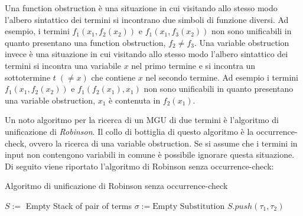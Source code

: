 \documentclass[./main.tex]{subfiles}
\begin{document}
Una function obstruction è una situazione in cui visitando allo stesso modo l'albero sintattico dei termini si incontrano
due simboli di funzione diversi. Ad esempio, i termini $f_1(x_1, f_2(x_2))$ e $f_1(x_1, f_3(x_2))$ non sono unificabili in quanto
presentano una function obstruction, $f_2 \neq f_3$. Una variable obstruction invece è una situazione in cui visitando allo stesso modo
l'albero sintattico dei termini si incontra una variabile $x$ nel primo termine 
e si incontra un sottotermine $t \; (\neq x)$ che contiene $x$ nel secondo termine. Ad esempio i termini $f_1(x_1, f_2(x_2))$ e $f_1(f_2(x_1), x_1)$
non sono unificabili in quanto presentano una variable obstruction, $x_1$ è contenuta in $f_2(x_1)$.


Un noto algoritmo per la ricerca di un MGU di due termini è l'algoritmo di unificazione di \textit{Robinson}. Il collo di bottiglia di questo 
algoritmo è la occurrence-check, ovvero la ricerca di una variable obstruction. Se si assume che i termini in 
input non contengono variabili in comune è possibile ignorare questa situazione. Di seguito viene riportato l'algoritmo di Robinson
senza occurrence-check:

\begin{algorithm}[H]
  \caption{Algoritmo di unificazione di Robinson senza occurrence-check}


  $S :=$ Empty Stack of pair of terms\;
  $\sigma := \text{Empty Substitution}$\;
  \BlankLine
  $S.push(\tau_1, \tau_2)$\;

  \Return{$\sigma$}\;
\end{algorithm}
\end{document}
